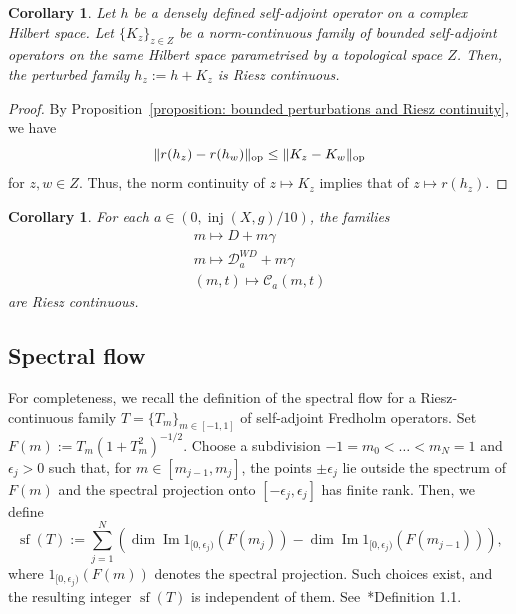 \documentclass[a4paper,oneside,12pt]{amsart}
\theoremstyle{plain}
\newtheorem{corollary}[theorem]{Corollary}
\theoremstyle{definition}
\theoremstyle{remark}
\DeclareMathOperator{\image}{Im}
\DeclareMathOperator{\spectralflow}{sf}
\DeclareMathOperator{\injectivityradius}{inj}
\DeclarePairedDelimiter{\operatornorm}{\lVert}{\rVert_{\mathrm{op}}}
\newcommand{\mesoscopicWilsonDiracoperator}[1][a]{\mathcal{D}_{#1}^{\mathit{WD}}}
\newcommand{\coupledoperator}[3][a]{\mathcal{C}_{#1}(#2,#3)}
\begin{document}
\begin{corollary}\label{corollary: bounded perturbation of a fixed operator}
  Let $h$ be a densely defined self-adjoint operator on a complex Hilbert space.
  Let $\{K_z\}_{z \in Z}$ be a norm-continuous family of bounded self-adjoint operators on the same Hilbert space parametrised by a topological space $Z$.
  Then, the perturbed family $h_z := h + K_z$ is Riesz continuous.
\end{corollary}
\begin{proof}
   By Proposition~\ref{proposition: bounded perturbations and Riesz continuity}, we have
  \begin{equation}
    \operatornorm{r(h_z)-r(h_w)} \le \operatornorm{K_z-K_w}
  \end{equation}
  for $z,w \in Z$.
  Thus, the norm continuity of $z \mapsto K_z$ implies that of $z \mapsto r(h_z)$.
\end{proof}

\begin{corollary}\label{corollary: Riesz-continuous family}
  For each $a \in (0,\injectivityradius(X,g)/10)$, the families
  \begin{gather}
    m \mapsto D + m\gamma \\
    m \mapsto \mesoscopicWilsonDiracoperator + m\gamma \\
    (m,t) \mapsto \coupledoperator{m}{t}
  \end{gather}
  are Riesz continuous.
\end{corollary}

\subsection{Spectral flow}

For completeness, we recall the definition of the spectral flow for a Riesz-continuous family $T = \{T_m\}_{m \in [-1,1]}$ of self-adjoint Fredholm operators.
Set $F(m) := T_m (1+T_m^2)^{-1/2}$.
Choose a subdivision $-1 = m_0 < \dots < m_N = 1$ and $\epsilon_j > 0$ such that, for $m \in [m_{j-1},m_j]$, the points $\pm \epsilon_j$ lie outside the spectrum of $F(m)$ and the spectral projection onto $[-\epsilon_j,\epsilon_j]$ has finite rank.
Then, we define
\begin{equation}
  \spectralflow (T) := \sum_{j=1}^N \left( \dim \image 1_{[0,\epsilon_j)}(F(m_j)) - \dim \image 1_{[0,\epsilon_j)}(F(m_{j-1})) \right),
\end{equation}
where $1_{[0,\epsilon_j)}(F(m))$ denotes the spectral projection.
Such choices exist, and the resulting integer $\spectralflow (T)$ is independent of them.
See~\cite{MR2114489}*{Definition 1.1}.
\end{document}
